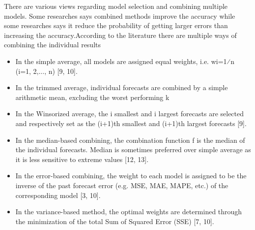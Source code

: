 There are various views regarding model selection and combining multiple models. Some researches says combined methods improve the accuracy while some researches says it reduce the probability of getting larger errors than increasing the accuracy.According to the literature there are multiple ways of combining the individual results 
\begin{itemize}
\item In the simple average, all models are assigned equal weights, i.e. wi=1⁄n (i=1, 2,..., n) [9, 10].
\end{itemize}
\begin{itemize}
\item In the trimmed average, individual forecasts are combined by a simple arithmetic mean, excluding the worst performing k%
\end{itemize}
\begin{itemize}
\item In the Winsorized average, the i smallest and i largest forecasts are selected and respectively set as the (i+1)th smallest and (i+1)th largest forecasts [9].
\end{itemize}
\begin{itemize}
\item In the median-based combining, the combination function f is the median of the individual forecasts. Median is sometimes preferred over simple average as it is less sensitive to extreme values [12, 13].
\end{itemize}
\begin{itemize}
\item In the error-based combining, the weight to each model is assigned to be the inverse of the past forecast error (e.g. MSE, MAE, MAPE, etc.) of the corresponding model [3, 10].
\end{itemize}
\begin{itemize}
\item In the variance-based method, the optimal weights are determined through the minimization of the total Sum of Squared Error (SSE) [7, 10].
\end{itemize}
